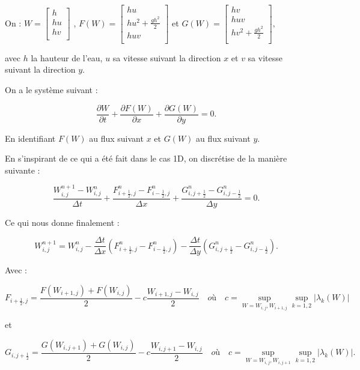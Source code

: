 \documentclass[
11pt, %
francais, %
singlespacing, %
headsepline, %
f%
]{MastersDoctoralThesis} %
\theoremstyle{definition}
\begin{document}
On : $W =
\left[ {\begin{array}{c}   h \\    hu \\    hv \\  \end{array} } \right] $
, $ F(W) =
\left[ {\begin{array}{c}   hu \\    hu^2 + \frac{gh^2}{2}  \\    huv  \\  \end{array} } \right] $
et $ G(W) =
\left[ {\begin{array}{c}   hv \\    huv  \\    hv^2 + \frac{gh^2}{2} \\  \end{array} } \right],
$

avec \(h\) la hauteur de l'eau, \(u\) sa vitesse suivant la direction
\(x\) et \(v\) sa vitesse suivant la direction \(y\).

On a le système suivant :

\[ \frac{\partial W}{\partial t} + \frac{\partial F(W)}{\partial x} + \frac{\partial G(W)}{\partial y} = 0. \]

En identifiant \(F(W)\) au flux suivant \(x\) et \(G(W)\) au flux
suivant \(y\).

En s'inspirant de ce qui a été fait dans le cas 1D, on discrétise de la
manière suivante :

\[ \frac{ W_{i,j}^{n+1} - W_{i,j}^{n} }{\Delta t} + \frac{ F_{i+\frac{1}{2},j}^{n} -  F_{i-\frac{1}{2},j}^{n} }{\Delta x} + \frac{G_{i,j+\frac{1}{2}}^{n} -  G_{i,j-\frac{1}{2}}^{n} }{\Delta y} = 0. \]

Ce qui nous donne finalement :

\[  W_{i,j}^{n+1} = W_{i,j}^n - \frac{\Delta t}{\Delta x} ( F_{i+\frac{1}{2},j}^{n} -  F_{i-\frac{1}{2},j}^{n} ) - \frac{\Delta t}{\Delta y} ( G_{i,j+\frac{1}{2}}^{n} -  G_{i,j-\frac{1}{2}}^{n} ). \]

Avec :

\[ F_{i+\frac{1}{2},j} =  \frac{ F(W_{i+1,j}) + F(W_{i,j}) }{2} - c \frac{ W_{i+1,j} - W_{i,j} }{2} \quad où \quad c = \sup_{W =  W_{i,j} ,  W_{i+1,j}} \sup_{k = 1,2} | \lambda _k(W) | \]

et

\[ G_{i,j+\frac{1}{2}} =  \frac{ G(W_{i,j+1}) + G(W_{i,j}) }{2} - c \frac{ W_{i,j+1} - W_{i,j} }{2} \quad où \quad c = \sup_{W =  W_{i,j} ,  W_{i,j+1}} \sup_{k = 1,2} | \lambda _k(W) |. \]
\end{document}
